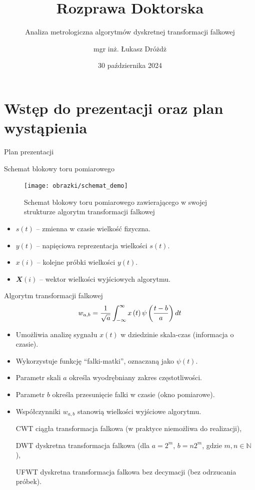 \documentclass[12pt, polish, aspectratio = 169]{slides}
\title{Rozprawa Doktorska}
\author{mgr inż. Łukasz Dróżdż}
\subtitle{Analiza metrologiczna algorytmów dyskretnej transformacji falkowej}
\institute{Politechnika Śląska, Wydział Elektryczny \\ Katedra Metrologii, Elektroniki i Automatyki}
\date{30 października 2024}
\begin{document}
\section*{Wstęp do prezentacji oraz plan wystąpienia}

\begin{frame}[plain]
\titlepage
\end{frame}

\begin{frame}{Plan prezentacji}
\tableofcontents
\end{frame}


\begin{frame}{Schemat blokowy toru pomiarowego}
\begin{figure}
\texttt{[image: obrazki/schemat\_demo]}
\caption{Schemat blokowy toru pomiarowego zawierającego w swojej strukturze algorytm transformacji falkowej}
\end{figure}
\begin{itemize}
\item $s(t)$ -- zmienna w czasie wielkość fizyczna.
\item $y(t)$ -- napięciowa reprezentacja wielkości $s(t)$.
\item $x(i)$ -- kolejne próbki wielkości $y(t)$.
\item $\mathbfit{X}(i)$ -- wektor wielkości wyjściowych algorytmu.
\end{itemize}
\end{frame}

\begin{frame}{Algorytm transformacji falkowej}
\begin{equation}
w_{a,b} = \frac{1}{\sqrt{a}} \int _{-\infty} ^{\infty} x \left(t\right) \psi \left(\frac{t-b}{a}\right) dt \label{eq:cwt}
\end{equation}
\begin{itemize}
\item Umożliwia analizę sygnału $x(t)$ w dziedzinie skala-czas (informacja o czasie).
\item Wykorzystuje funkcję \enquote{falki-matki}, oznaczaną jako $\psi(t)$.
\item Parametr skali $a$ określa wyodrębniany zakres częstotliwości.
\item Parametr $b$ określa przesunięcie falki w czasie (okno pomiarowe).
\item Współczynniki $w_{a,b}$ stanowią wielkości wyjściowe algorytmu.
\end{itemize}
\begin{itemize}
\item[CWT] ciągła transformacja falkowa (w praktyce niemożliwa do realizacji),
\item[DWT] dyskretna transformacja falkowa (dla $a = 2^m$, $b = n2^m$, gdzie $m, n \in \mathbb{N}$),
\item[UFWT] dyskretna transformacja falkowa bez decymacji (bez odrzucania próbek).
\end{itemize}
\end{frame}
\end{document}
